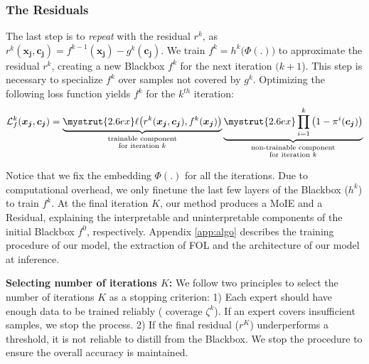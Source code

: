 \subsubsection{The Residuals}
The last step is to \emph{repeat} with the residual $r^k$, as $\displaystyle r^k(\boldsymbol{x_j},\boldsymbol{c_j}) = f^{k - 1}(\boldsymbol{x_j}) - g^k(\boldsymbol{c_j})$.
We train $f^k = h^k\big(\Phi(.)\big)$ to approximate the residual $r^k$, creating a new Blackbox $f^k$ for the next iteration $(k+1$). This step is necessary to specialize $\displaystyle f^k$ over samples not covered by $g^k$. Optimizing the following loss function yields $\displaystyle f^k$ for the $\displaystyle k^{th}$ iteration:
\begin{equation}
\label{equ: residual}
\mathcal{L}_f^k(\boldsymbol{x_j}, \boldsymbol{c_j}) = \underbrace{\mystrut{2.6ex}\ell\big(r^k(\boldsymbol{x_j}, \boldsymbol{c_j}), f^k(\boldsymbol{x_j})\big)}_{\substack{\text{trainable component} \\ \text{for iteration $k$}}} \underbrace{\mystrut{2.6ex}\prod_{i=1} ^{k}\big(1 - \pi^i(\boldsymbol{c_j})\big)}_{\substack{\text{non-trainable component} \\ \text{for iteration $k$}}} 
\end{equation}

Notice that we fix the embedding $\displaystyle \Phi(.)$ for all the iterations. Due to computational overhead, we only finetune the last few layers of the Blackbox ($h^k$) to train $f^k$.
At the final iteration $K$, our method produces a MoIE and a Residual, explaining the interpretable and uninterpretable components of the initial Blackbox $f^0$, respectively. Appendix \ref{app:algo} describes the training procedure of our model, the extraction of FOL and the architecture of our model at inference.


\textbf{Selecting number of iterations $K$:} We follow two principles to select the number of iterations $K$ as a stopping criterion: 1) Each expert should have enough data to be trained reliably (
coverage $\zeta^k$). If an expert covers insufficient samples, we stop the process. 2) If the final residual ($r^K$) underperforms a threshold, it is not reliable to distill from the Blackbox. We stop the procedure to ensure the overall accuracy is maintained.